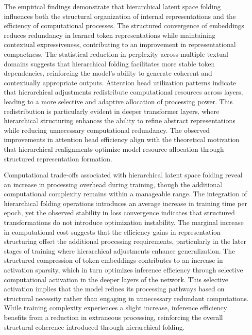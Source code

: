 \documentclass[5p,times]{elsarticle}
\begin{document}
The empirical findings demonstrate that hierarchical latent space folding influences both the structural organization of internal representations and the efficiency of computational processes. The structured convergence of embeddings reduces redundancy in learned token representations while maintaining contextual expressiveness, contributing to an improvement in representational compactness. The statistical reduction in perplexity across multiple textual domains suggests that hierarchical folding facilitates more stable token dependencies, reinforcing the model’s ability to generate coherent and contextually appropriate outputs. Attention head utilization patterns indicate that hierarchical adjustments redistribute computational resources across layers, leading to a more selective and adaptive allocation of processing power. This redistribution is particularly evident in deeper transformer layers, where hierarchical structuring enhances the ability to refine abstract representations while reducing unnecessary computational redundancy. The observed improvements in attention head efficiency align with the theoretical motivation that hierarchical realignments optimize model resource allocation through structured representation formation.

Computational trade-offs associated with hierarchical latent space folding reveal an increase in processing overhead during training, though the additional computational complexity remains within a manageable range. The integration of hierarchical folding operations introduces an average increase in training time per epoch, yet the observed stability in loss convergence indicates that structured transformations do not introduce optimization instability. The marginal increase in computational cost suggests that the efficiency gains in representation structuring offset the additional processing requirements, particularly in the later stages of training where hierarchical adjustments enhance generalization. The structured compression of token embeddings contributes to an increase in activation sparsity, which in turn optimizes inference efficiency through selective computational activation in the deeper layers of the network. This selective activation implies that the model refines its processing pathways based on structural necessity rather than engaging in unnecessary redundant computations. While training complexity experiences a slight increase, inference efficiency benefits from a reduction in extraneous processing, reinforcing the overall structural coherence introduced through hierarchical folding.
\end{document}
